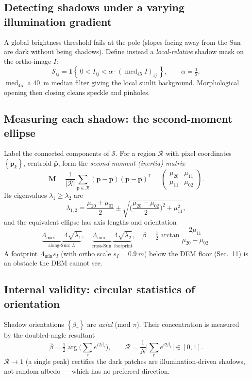 \documentclass[11pt]{article}
\theoremstyle{definition}
\newcommand{\abs}[1]{\left\lvert #1 \right\rvert}
\newcommand{\set}[1]{\left\{ #1 \right\}}
\newcommand{\med}{\operatorname{med}}
\newcommand{\T}{^{\mathsf{T}}}
\newcommand{\half}{\tfrac{1}{2}}
\begin{document}
\subsection{Detecting shadows under a varying illumination gradient}
A global brightness threshold fails at the pole (slopes facing away from the Sun are
dark without being shadows). Define instead a \emph{local-relative} shadow mask on the
ortho-image $I$:
\begin{equation}
\mathcal S_{ij}=\mathbf 1\!\set{\,0<I_{ij}<\alpha\cdot(\med_{45}I)_{ij}\,},\qquad \alpha=\tfrac12,
\end{equation}
$\med_{45}$ a \SI{40}{m} median filter giving the local sunlit background. Morphological
opening then closing cleans speckle and pinholes.

\subsection{Measuring each shadow: the second-moment ellipse}
Label the connected components of $\mathcal S$. For a region $\mathcal R$ with pixel
coordinates $\set{\mathbf p_k}$, centroid $\bar{\mathbf p}$, form the
\emph{second-moment (inertia) matrix}
\begin{equation}
\mathbf M=\frac{1}{\abs{\mathcal R}}\sum_{\mathbf p\in\mathcal R}(\mathbf p-\bar{\mathbf p})(\mathbf p-\bar{\mathbf p})\T
=\begin{pmatrix}\mu_{20}&\mu_{11}\\ \mu_{11}&\mu_{02}\end{pmatrix}.
\end{equation}
Its eigenvalues $\lambda_1\ge\lambda_2$ are
\begin{equation}
\lambda_{1,2}=\frac{\mu_{20}+\mu_{02}}{2}\pm\sqrt{\Big(\frac{\mu_{20}-\mu_{02}}{2}\Big)^2+\mu_{11}^2},
\end{equation}
and the equivalent ellipse has axis lengths and orientation
\begin{equation}
\underbrace{\Lambda_{\max}=4\sqrt{\lambda_1}}_{\text{along-Sun: }L},\quad
\underbrace{\Lambda_{\min}=4\sqrt{\lambda_2}}_{\text{cross-Sun: footprint}},\quad
\beta=\half\arctan\!\frac{2\mu_{11}}{\mu_{20}-\mu_{02}}.
\end{equation}
A footprint $\Lambda_{\min}s_I$ (with ortho scale $s_I=\SI{0.9}{m}$) below the DEM
floor (Sec.~11) is an obstacle the DEM cannot see.

\subsection{Internal validity: circular statistics of orientation}
Shadow orientations $\set{\beta_r}$ are \emph{axial} (mod $\pi$). Their concentration
is measured by the doubled-angle resultant
\begin{equation}
\bar\beta=\half\arg\!\Big(\sum_r e^{i2\beta_r}\Big),\qquad
\mathcal R=\frac{1}{N}\Big|\sum_r e^{i2\beta_r}\Big|\in[0,1].
\end{equation}
$\mathcal R\to1$ (a single peak) certifies the dark patches are illumination-driven
shadows, not random albedo --- which has no preferred direction.
\end{document}
